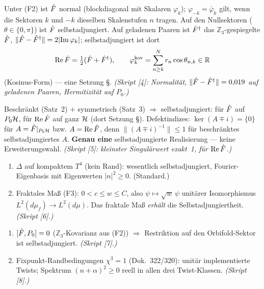\begin{tcolorbox}[proofbox, title={Satz 3 — $\mathbb{Z}_3$-Paarung: Normalität \B, Symmetrie auf $P_0$ \B}]
  Unter (F2) ist $\hat{F}$ normal (blockdiagonal mit Skalaren $\varphi_k$);
  $\varphi_{-k} = \bar\varphi_k$ gilt, wenn die Sektoren $k$ und $-k$
  dieselben Skalenstufen $n$ tragen.
  Auf den Nullsektoren ($\theta \in \{0,\pi\}$) ist $\hat{F}$ selbstadjungiert.
  Auf geladenen Paaren ist $\hat{F}^\dagger$ das $\mathbb{Z}_3$-gespiegelte $\hat{F}$,
  $\|\hat{F}-\hat{F}^\dagger\| = 2|\mathrm{Im}\,\varphi_k|$;
  selbstadjungiert ist dort
  \[
    \mathrm{Re}\,\hat{F} = \tfrac12(\hat{F}+\hat{F}^\dagger), \qquad
    \varphi_k^{\text{kov}} = \sum_{n\ge k}^{N} r_n \cos\theta_{n,k} \in \mathbb{R}
  \]
  (Kosinus-Form) — eine Setzung \S.
  \emph{(Skript [4]: Normalität, $\|\hat{F}-\hat{F}^\dagger\| = 0{,}019$ auf geladenen Paaren, Hermitizität auf $P_0$.)}
\end{tcolorbox}

\begin{tcolorbox}[proofbox, title={Korollar 4 — Selbstadjungiertheit, Defektindizes $(0,0)$ \B\ auf $P_0$}]
  Beschränkt (Satz~2) $+$ symmetrisch (Satz~3)
  $\Rightarrow$ selbstadjungiert: für $\hat{F}$ auf $P_0\mathcal{H}$, für
  $\mathrm{Re}\,\hat{F}$ auf ganz $\mathcal{H}$ (dort Setzung \S).
  Defektindizes:
  $\ker(A \mp i) = \{0\}$ für $A = \hat{F}|_{P_0\mathcal{H}}$ bzw. $A = \mathrm{Re}\,\hat{F}$,
  denn $\|(A \mp i)^{-1}\| \le 1$ für beschränktes selbstadjungiertes $A$.
  \textbf{Genau eine} selbstadjungierte Realisierung — keine Erweiterungswahl.
  \emph{(Skript [5]: kleinster Singulärwert exakt~1, für $\mathrm{Re}\,\hat{F}$.)}
\end{tcolorbox}

\begin{tcolorbox}[proofbox, title={Satz 5 — Tensorfaktor $\hat\Delta_{T^4}$ mit fraktalem Maß \B}]
  \begin{enumerate}
    \item $\Delta$ auf kompaktem $T^4$ (kein Rand): wesentlich selbstadjungiert,
      Fourier-Eigenbasis mit Eigenwerten $|n|^2 \ge 0$. (Standard.)
    \item Fraktales Maß (F3): $0 < c \le w \le C$, also
      $\psi \mapsto \sqrt{w}\,\psi$ unitärer Isomorphismus
      $L^2(d\mu_f) \to L^2(d\mu)$.
      Das fraktale Maß \emph{erhält} die Selbstadjungiertheit.
      \emph{(Skript [6].)}
  \end{enumerate}
\end{tcolorbox}

\begin{tcolorbox}[proofbox, title={Satz 6 — $\mathbb{Z}_3$-Restriktion und $\chi$-Twists \B}]
  \begin{enumerate}
    \item $[\hat{F}, P_0] = 0$ ($\mathbb{Z}_3$-Kovarianz aus (F2))
      $\Rightarrow$ Restriktion auf den Orbifold-Sektor ist selbstadjungiert.
      \emph{(Skript [7].)}
    \item Fixpunkt-Randbedingungen $\chi^3 = 1$ (Dok.~322/320):
      unitär implementierte Twists; Spektrum $(n+\alpha)^2 \ge 0$ reell
      in allen drei Twist-Klassen.
      \emph{(Skript [8].)}
  \end{enumerate}
\end{tcolorbox}

